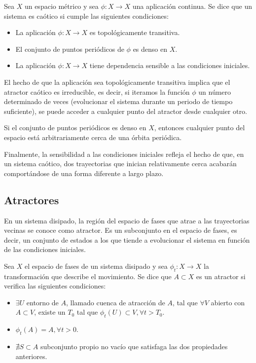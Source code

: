 \begin{definition}
	Sea $X$ un espacio métrico y sea $\phi: X \to X$ una aplicación continua. Se dice que un sistema es caótico si cumple las siguientes condiciones:
	
	\begin{itemize}
		\item La aplicación $\phi: X \to X$ es topológicamente transitiva. 
		\item El conjunto de puntos periódicos de $\phi$ es denso en $X$.  
		\item La aplicación $\phi: X \to X$ tiene dependencia sensible a las condiciones iniciales. 
	\end{itemize}	
	
\end{definition}

El hecho de que la aplicación sea topológicamente transitiva implica que el atractor caótico es irreducible, es decir, si iteramos la función $\phi$ un número determinado de veces (evolucionar el sistema durante un periodo de tiempo suficiente), se puede acceder a cualquier punto del atractor desde cualquier otro.

Si el conjunto de puntos periódicos es denso en $X$, entonces cualquier punto del espacio está arbitrariamente cerca de una órbita periódica. 

Finalmente, la sensibilidad a las condiciones iniciales refleja el hecho de que, en un sistema caótico, dos trayectorias que inician relativamente cerca acabarán comportándose de una forma diferente a largo plazo. 

\subsection{Atractores}

En un sistema disipado, la región del espacio de fases que atrae a las trayectorias vecinas se conoce como atractor. Es un subconjunto en el espacio de fases, es decir, un conjunto de estados a los que tiende a evolucionar el sistema en función de las condiciones iniciales.

\begin{definition}
	Sea $X$ el espacio de fases de un sistema disipado y sea $\phi_t: X \to X$ la transformación que describe el movimiento. Se dice que $A \subset X$ es un atractor si verifica las siguientes condiciones:
	
	\begin{itemize}
		
		\item $\exists U$ entorno de $A$, llamado cuenca de atracción de $A$, tal que $\forall V$ abierto con $A \subset V$, existe un $T_0$ tal que $\phi_t(U) \subset V, \forall t > T_0$.
		
		\item $\phi_t(A) = A, \forall t > 0$.
		
		\item $\nexists S \subset A$ subconjunto propio no vacío que satisfaga las dos propiedades anteriores.
		
	\end{itemize} 
	
\end{definition} 

